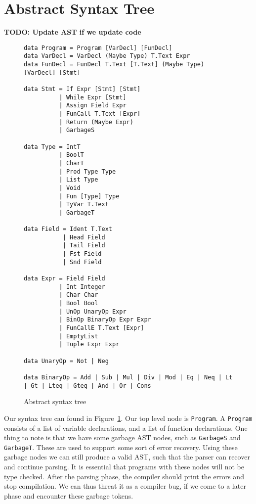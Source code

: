 \section{Abstract Syntax Tree}
\textbf{TODO: Update AST if we update code}
\begin{figure}
\begin{verbatim}
data Program = Program [VarDecl] [FunDecl]
data VarDecl = VarDecl (Maybe Type) T.Text Expr
data FunDecl = FunDecl T.Text [T.Text] (Maybe Type) [VarDecl] [Stmt]

data Stmt = If Expr [Stmt] [Stmt]
          | While Expr [Stmt]
          | Assign Field Expr
          | FunCall T.Text [Expr]
          | Return (Maybe Expr)
          | GarbageS

data Type = IntT
          | BoolT
          | CharT
          | Prod Type Type
          | List Type
          | Void
          | Fun [Type] Type
          | TyVar T.Text
          | GarbageT

data Field = Ident T.Text
           | Head Field
           | Tail Field
           | Fst Field
           | Snd Field

data Expr = Field Field
          | Int Integer
          | Char Char
          | Bool Bool
          | UnOp UnaryOp Expr
          | BinOp BinaryOp Expr Expr
          | FunCallE T.Text [Expr]
          | EmptyList
          | Tuple Expr Expr

data UnaryOp = Not | Neg

data BinaryOp = Add | Sub | Mul | Div | Mod | Eq | Neq | Lt | Gt | Lteq | Gteq | And | Or | Cons
\end{verbatim}
	\caption{Abstract syntax tree}\label{fig:ast}
\end{figure}
Our syntax tree can found in Figure~\ref{fig:ast}.
Our top level node is \texttt{Program}.
A \texttt{Program} consists of a list of variable declarations,
and a list of function declarations.
One thing to note is that we have some garbage AST nodes, such as \texttt{GarbageS} and \texttt{GarbageT}.
These are used to support some sort of error recovery.
Using these garbage nodes we can still produce a valid AST,
such that the parser can recover and continue parsing.
It is essential that programs with these nodes will not be type checked.
After the parsing phase, the compiler should print the errors and stop compilation.
We can thus threat it as a compiler bug, if we come to a later phase and encounter these garbage tokens.

